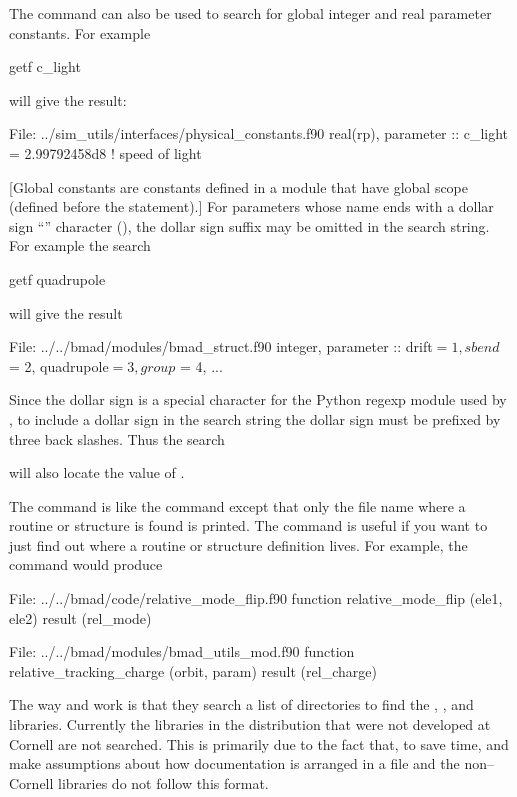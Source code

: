 {{{{{{The  command can also be used to search for global integer and real parameter constants. For example
\begin{example}
  getf c_light
\end{example}
will give the result:
\begin{example}
  File: ../sim_utils/interfaces/physical_constants.f90
      real(rp), parameter :: c_light = 2.99792458d8              ! speed of light
\end{example}
[Global constants are constants defined in a module that have global scope (defined before the
 statement).] For parameters whose name ends with a dollar sign ``\vn{\$}'' character
(), the dollar sign suffix may be omitted in the search string. For example
the search
\begin{example}
  getf quadrupole
\end{example}
will give the result
\begin{example}
  File: ../../bmad/modules/bmad_struct.f90
      integer, parameter :: drift$ = 1, sbend$ = 2, quadrupole$ = 3, group$ = 4, ...
\end{example}
Since the dollar sign is a special character for the Python regexp module used by , to
include a dollar sign in the search string the dollar sign must be prefixed by three back
slashes. Thus the search
will also locate the value of .

The  command is like the  command except that only
the file name where a routine or structure is found is printed.
The  command is useful if you
want to just find out where a routine or structure definition lives.
For example, the  command would produce
\begin{example}
  File: ../../bmad/code/relative_mode_flip.f90
      function relative_mode_flip (ele1, ele2) result (rel_mode)

  File: ../../bmad/modules/bmad_utils_mod.f90
      function relative_tracking_charge (orbit, param) result (rel_charge)
\end{example}

The way  and  work is that they search a list of
directories to find the , , and 
libraries. Currently the libraries in the \bmad distribution that were
not developed at Cornell are not searched. This is primarily due to
the fact that, to save time,  and  make assumptions
about how documentation is arranged in a file and the non--Cornell libraries 
do not follow this format.

}}}}}}
